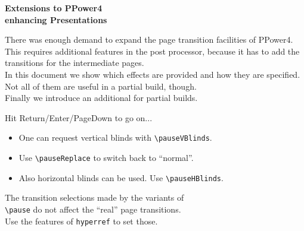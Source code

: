\documentclass[30pt,landscape]{foils}
\begin{document}
{\Large\normalcolor\bf
  Extensions to PPower4\\
  \null\hfill enhancing Presentations\break}

{\noindent\small
There was enough demand to expand the page transition facilities of 
PPower4. This requires additional features in the post processor,
because it has to add the transitions for the intermediate pages.\\
In this document we show which effects are provided and how they are
specified. Not all of them are useful in a partial build, though.\\
Finally we introduce an additional 
for partial builds.\pause}

{\tiny
Hit Return/Enter/PageDown to go on...\hfill{}}

\raggedright
\begin{itemize}
\item One can request vertical blinds
   with \verb|\pauseVBlinds|.\pauseVBlinds
\item Use \verb|\pauseReplace| to switch back to ``normal''.\pauseReplace
\item Also horizontal blinds can be used. Use
  \verb|\pauseHBlinds|.\pauseHBlinds
\end{itemize}{\small
The transition selections made by the variants of \\
\verb|\pause| do not affect the ``real'' page transitions.\\
Use the features of \verb|hyperref| to set those.\endgraf}
\end{document}
